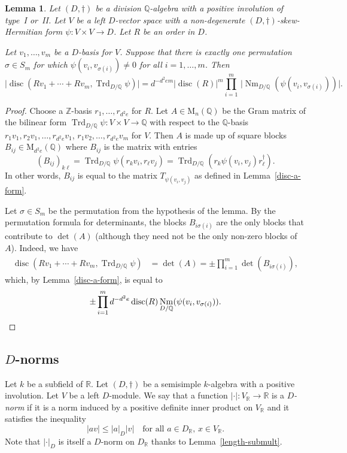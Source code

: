 \documentclass[11pt]{article}
\numberwithin{equation}{section}
\newcommand{\bQ}{\mathbb{Q}}
\newcommand{\bR}{\mathbb{R}}
\newcommand{\bZ}{\mathbb{Z}}
\newcommand{\rM}{\mathrm{M}}
\DeclareMathOperator{\disc}{disc}
\DeclareMathOperator{\Nm}{Nm}
\DeclareMathOperator{\Trd}{Trd}
\newcommand{\abs}[1]{\lvert #1 \rvert}
\newcommand{\defterm}[1]{\emph{#1}}
\newtheorem{lemma}{Lemma}[section]
\begin{document}
\begin{lemma} \label{disc-triangular}
Let $(D, \dag)$ be a division $\bQ$-algebra with a positive involution of type~I or~II.
Let $V$ be a left $D$-vector space with a non-degenerate $(D,\dag)$-skew-Hermitian form $\psi \colon V \times V \to D$.
Let $R$ be an order in $D$.

Let $v_1, \dotsc, v_m$ be a $D$-basis for $V$.
Suppose that there is exactly one permutation $\sigma \in S_m$ for which $\psi(v_i, v_{\sigma(i)}) \neq 0$ for all $i = 1, \dotsc, m$.
Then
\[
\abs{\disc(Rv_1 + \dotsb + Rv_m, \Trd_{D/\bQ} \psi)} = d^{-d^2em} \abs{\disc(R)}^m \prod_{i=1}^m\, \abs{\Nm_{D/\bQ}(\psi(v_i, v_{\sigma(i)}))}.
\]
\end{lemma}

\begin{proof}
Choose a $\bZ$-basis $r_1, \dotsc, r_{d^2e}$ for $R$.
Let $A \in \rM_n(\bQ)$ be the Gram matrix of the bilinear form $\Trd_{D/\bQ} \psi \colon V \times V \to \bQ$ with respect to the $\bQ$-basis $r_1 v_1, r_2 v_1, \dotsc, r_{d^2e} v_1$, $r_1 v_2, \dotsc, r_{d^2e} v_m$ for $V$.
Then $A$ is made up of square blocks $B_{ij} \in \rM_{d^2e}(\bQ)$ where $B_{ij}$ is the matrix with entries
\[
(B_{ij})_{k\ell} = \Trd_{D/\bQ} \psi(r_k v_i, r_\ell v_j) = \Trd_{D/\bQ}(r_k\psi(v_i, v_j)r_\ell^\dag).
\]
In other words, $B_{ij}$ is equal to the matrix $T_{\psi(v_i, v_j)}$ as defined in Lemma~\ref{disc-a-form}.

Let $\sigma \in S_m$ be the permutation from the hypothesis of the lemma.
By the permutation formula for determinants, the blocks $B_{i\sigma(i)}$ are the only blocks that
contribute to $\det(A)$ (although they need not be the only non-zero blocks of~$A$).
Indeed, we have
\begin{align*}
\disc(Rv_1 + \dotsb + Rv_m, \Trd_{D/\bQ} \psi)
& = \det(A)
= \pm \prod_{i=1}^m \det(B_{i\sigma(i)}),
\end{align*}
which, by Lemma~\ref{disc-a-form}, is equal to
\[
\pm \prod_{i=1}^m d^{-d^2e} \disc(R) \Nm_{D/\bQ}(\psi(v_i, v_{\sigma(i)})).
\qedhere
\]
\end{proof}

\subsection{\texorpdfstring{$D$}{D}-norms}

Let $k$ be a subfield of $\bR$.
Let $(D,\dag)$ be a semisimple $k$-algebra with a positive involution.
Let $V$ be a left $D$-module.
We say that a function $\abs{\cdot} \colon V_\bR \to \bR$ is a \defterm{$D$-norm} if it is a norm induced by a positive definite inner product on $V_\bR$ and it satisfies the inequality
\[
\abs{av} \leq \abs{a}_D \abs{v} \quad\text{for all } a \in D_\bR,\, x \in V_\bR.
\]
Note that $\abs{\cdot}_D$ is itself a $D$-norm on $D_\bR$ thanks to Lemma~\ref{length-submult}.
\end{document}
